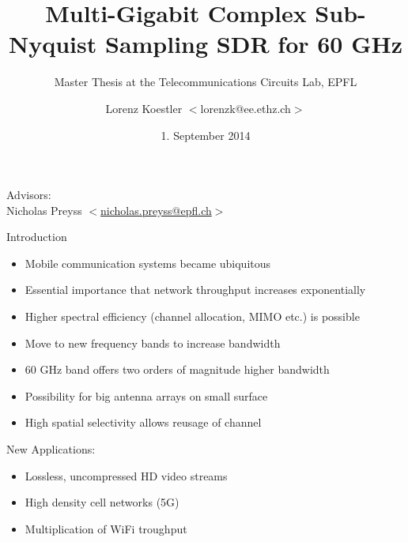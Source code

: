 \documentclass[10pt]{beamer}
\title{Multi-Gigabit Complex Sub-Nyquist Sampling SDR for 60 GHz}
\subtitle{Master Thesis at the Telecommunications Circuits Lab, EPFL}
\author{Lorenz Koestler $ < $lorenzk@ee.ethz.ch$ > $}
\date[1.9..2013]{1. September 2014}
\begin{document}
{
  \begin{frame}
    \titlepage

    {\color{white}
      Advisors: \\
      Nicholas Preyss $ < $\href{mailto:nicholas.preyss@epfl.ch}{nicholas.preyss@epfl.ch}$ > $ \\
    }
  \end{frame}
}

\begin{frame}{Introduction}
  \begin{itemize}
  \item Mobile communication systems became ubiquitous
  \item Essential importance that network throughput increases
    exponentially
  \item Higher spectral efficiency (channel allocation, MIMO etc.) is possible
  \item Move to new frequency bands to increase bandwidth
  \item 60 GHz band offers two orders of magnitude higher bandwidth
  \item Possibility for big antenna arrays on small surface
  \item High spatial selectivity allows reusage of channel
  \end{itemize}
  \begin{block}{New Applications:}
    \begin{itemize}
    \item Lossless, uncompressed HD video streams
    \item High density cell networks (5G)
    \item Multiplication of WiFi troughput
    \end{itemize}
  \end{block}
\end{frame}
\end{document}
